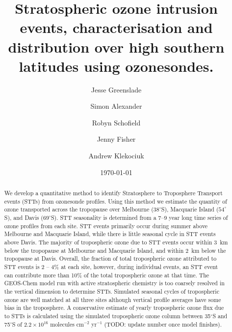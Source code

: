 \documentclass{article}
\begin{document}
\title{Stratospheric ozone intrusion events, characterisation and distribution over high southern latitudes using ozonesondes.}

\author[1]{Jesse Greenslade}
\author[2]{Simon Alexander}
\author[3,4]{Robyn Schofield}
\author[1,5]{Jenny Fisher}
\author[2]{Andrew Klekociuk}


\date{\today}



\maketitle

\begin{abstract}
  We develop a quantitative method to identify Stratosphere to Troposphere Transport events (STTs) from ozonesonde profiles. 
  Using this method we estimate the quantity of ozone transported across the tropopause over Melbourne ($38^\circ$S), Macquarie Island ($54^\circ$S), and Davis ($69^\circ$S).
  STT seasonality is determined from a 7--9 year long time series of ozone profiles from each site.
  STT events primarily occur during summer above Melbourne and Macquarie Island, while there is little seasonal cycle in STT events above Davis.
  The majority of tropospheric ozone due to STT events occur within 3~km below the tropopause at Melbourne and Macquarie Island, and within 2~km below the tropopause at Davis.
  Overall, the fraction of total tropospheric ozone attributed to STT events is 2 – 4\% at each site, however, during individual events, an STT event can contribute more than 10\% of the total tropospheric ozone at that time.
  The GEOS-Chem model run with active stratospheric chemistry is too coarsely resolved in the vertical dimension to determine STTs.
  Simulated seasonal cycles of tropospheric ozone are well matched at all three sites although vertical profile averages have some bias in the troposphere.
  A conservative estimate of yearly tropospheric ozone flux due to STTs is calculated using the simulated tropospheric ozone column between 35$^\circ$S and  75$^\circ$S of $2.2\times10^{16}$ molecules cm$^{-2}$ yr$^{-1}$ (TODO: update number once model finishes).
  
\end{abstract}%
\end{document}
